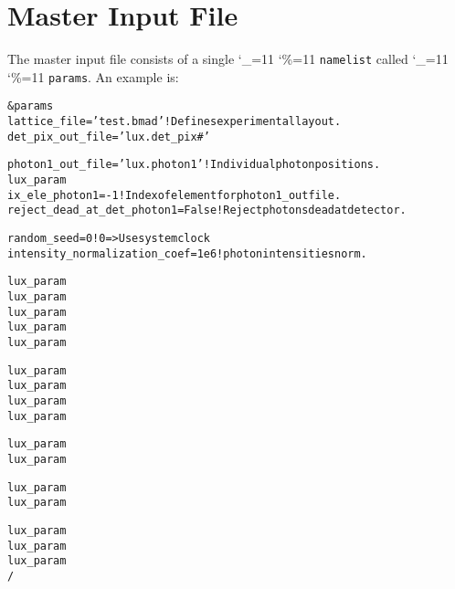 \documentclass[11pt]{article}
\newcommand\ttcmd{\begingroup\catcode`\_=11 \catcode`\%=11 \dottcmd}
\newcommand\dottcmd[1]{\texttt{#1}\endgroup}
\newcommand{\vn}{\ttcmd}
\newenvironment{example}
  {\vspace{\ExBeg} \begin{alltt}}
  {\end{alltt} \vspace{\ExEnd}}
\newlength{\ExBeg}
\newlength{\ExEnd}
\begin{document}
\section{Master Input File} 
\label{s:master.file}

The master input file consists of a single \vn{namelist} called \vn{params}.
An example is:
\begin{example}
  &params
  	lattice_file = 'test.bmad'                     ! Defines experimental layout.
    det_pix_out_file = 'lux.det_pix#'

    photon1_out_file = 'lux.photon1'               ! Individual photon positions.
    lux_param%
    ix_ele_photon1 = -1                            ! Index of element for photon1_out file.
    reject_dead_at_det_photon1 = False             ! Reject photons dead at detector.

    random_seed = 0                                ! 0 => Use system clock
    intensity_normalization_coef = 1e6             ! photon intensities norm.

    lux_param%
    lux_param%
    lux_param%
    lux_param%
    lux_param%

    lux_param%
    lux_param%
    lux_param%
    lux_param%

    lux_param%
    lux_param%

    lux_param%
    lux_param%

    lux_param%
    lux_param%
    lux_param%
  /
\end{example}
\end{document}
